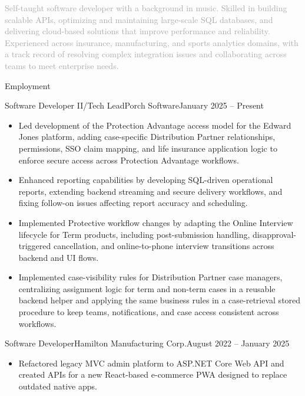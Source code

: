 \documentclass[calibri]{mcdowellcv}
\begin{document}
	\makeheader

	\textcolor{darkgray}{Self-taught software developer with a background in music. Skilled in building scalable APIs, optimizing and maintaining large-scale SQL databases, and delivering cloud-based solutions that improve performance and reliability. Experienced across insurance, manufacturing, and sports analytics domains, with a track record of resolving complex integration issues and collaborating across teams to meet enterprise needs.}
	
	\begin{cvsection}{Employment}
		\begin{cvsubsection}{Software Developer II/Tech Lead}{Porch Software}{January 2025 -- Present}
			\begin{itemize}
				\item Led development of the Protection Advantage access model for the Edward Jones platform, adding case-specific Distribution Partner relationships, permissions, SSO claim mapping, and life insurance application logic to enforce secure access across Protection Advantage workflows.
				\item Enhanced reporting capabilities by developing SQL-driven operational reports, extending backend streaming and secure delivery workflows, and fixing follow-on issues affecting report accuracy and scheduling.
				\item Implemented Protective workflow changes by adapting the Online Interview lifecycle for Term products, including post-submission handling, disapproval-triggered cancellation, and online-to-phone interview transitions across backend and UI flows.
				\item Implemented case-visibility rules for Distribution Partner case managers, centralizing assignment logic for term and non-term cases in a reusable backend helper and applying the same business rules in a case-retrieval stored procedure to keep teams, notifications, and case access consistent across workflows.
			\end{itemize}
		\end{cvsubsection}
		\begin{cvsubsection}{Software Developer}{Hamilton Manufacturing Corp.}{August 2022 -- January 2025}
			\begin{itemize}
				\item Refactored legacy MVC admin platform to ASP.NET Core Web API and created APIs for a new React-based e-commerce PWA designed to replace outdated native apps. 

\end{itemize}
\end{cvsubsection}
\end{cvsection}
\end{document}

